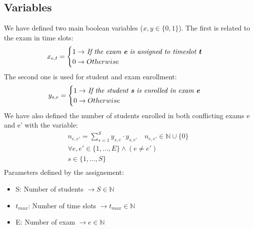 \documentclass[12pt]{article}
\begin{document}
\subsection{Variables}
We have defined two main boolean variables ($x,y \in \{0,1\} $). The first is related to the exam in time slots:
\begin{equation}
  \begin{gathered}
    x_{e,t} = \begin{cases} 1 \rightarrow $ \textit{If the exam \textbf{e} is assigned to timeslot \textbf{t}}$ \\ 0 \rightarrow Otherwise \end{cases}
  \end{gathered}
\end{equation}
The second one is used for student and exam enrollment:
\begin{equation}
  \begin{gathered}
    y_{s,e} = \begin{cases} 1 \rightarrow $ \textit{If the student \textbf{s} is enrolled in exam \textbf{e}}$ \\ 0 \rightarrow Otherwise \end{cases}
  \end{gathered}
\end{equation}
We have also defined the number of students enrolled in both conflicting exams e and e' with the variable:
\begin{equation}
  \begin{gathered}
    n_{e,e'} = \sum_{s = 1}^{S} y_{s,e} \cdot y_{s,e'} \quad n_{e,e'} \in \mathbb{N} \cup \{0\}\\
    \forall e, e' \in \{1,...,E\} \wedge (e \neq e')\\
    s\in\{1,...,S\}\\
  \end{gathered}
\end{equation}
Parameters defined by the assignement:
\begin{itemize}
  \item S: Number of students $\rightarrow S \in \mathbb{N}$
  \item $t_{max}$: Number of time slots $\rightarrow t_{max} \in \mathbb{N}$
  \item E: Number of exam $\rightarrow e \in \mathbb{N}$
\end{itemize}
\end{document}
